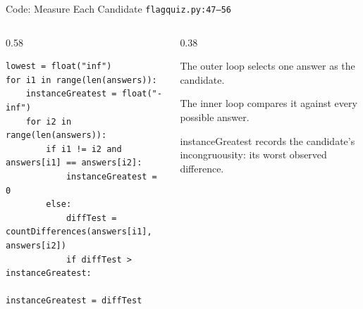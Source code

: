 \documentclass[aspectratio=169,11pt]{beamer}
\begin{document}
\begin{frame}[fragile]{Code: Measure Each Candidate}
\scriptsize
{} \texttt{flagquiz.py:47--56}

\vspace{0.08cm}
\begin{columns}[T,totalwidth=\textwidth]
\begin{column}{0.58\textwidth}
\begin{lstlisting}[style=cpcode]
lowest = float("inf")
for i1 in range(len(answers)):
    instanceGreatest = float("-inf")
    for i2 in range(len(answers)):
        if i1 != i2 and answers[i1] == answers[i2]:
            instanceGreatest = 0
        else:
            diffTest = countDifferences(answers[i1], answers[i2])
            if diffTest > instanceGreatest:
                instanceGreatest = diffTest
\end{lstlisting}
\end{column}
\begin{column}{0.38\textwidth}
\begin{tightitemize}
  \item The outer loop selects one answer as the candidate.
  \item The inner loop compares it against every possible answer.
  \item instanceGreatest records the candidate's incongruousity: its worst observed difference.
\end{tightitemize}
\end{column}
\end{columns}
\end{frame}
\end{document}

